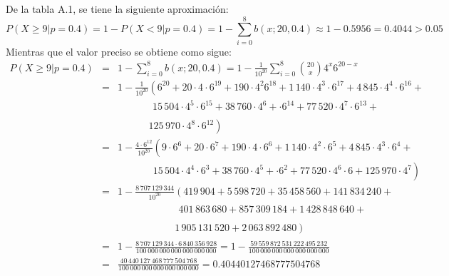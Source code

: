 \begin{solucion}
 \begin{valorp}
  De la tabla A.1, se tiene la siguiente aproximaci\'on:
  \begin{equation*}
   P\left( X \geq 9 | p = 0.4 \right) = 1 - P\left( X < 9 | p = 0.4 \right)
   = 1 - \sum_{i=0}^{8} b\left( x; 20, 0.4 \right)
   \approx 1 - 0.5956 = 0.4044 > 0.05
  \end{equation*}
  Mientras que el valor preciso se obtiene como sigue:
  \begin{eqnarray*}
   P\left( X \geq 9 | p = 0.4 \right) & = & 1 - \sum_{i=0}^{8} b\left( x; 20, 0.4 \right)
   = 1 - \frac{1}{10^{20}} \sum_{i=0}^{8} \binom{20}{x} 4^x 6^{20-x} \\
   & = & 1 - \frac{1}{10^{20}}\left( 6^{20} + 20\cdot 4\cdot 6^{19} + 
   190 \cdot 4^{2}6^{18} + 1\,140 \cdot 4^{3}\cdot 6^{17} +
   4\,845 \cdot 4^{4}\cdot 6^{16} + \right. \\
   & & \phantom{1 - \frac{1}{10^{20}} (}
   15\,504 \cdot 4^{5}\cdot 6^{15} +
   38\,760 \cdot 4^{6} + \cdot 6^{14} + 
   77\,520 \cdot 4^{7} \cdot 6^{13} + \\
   & & \phantom{1 - \frac{1}{10^{20}}}
   \left. 125\,970 \cdot 4^{8} \cdot 6^{12} \right) \\
   & = & 1 - \frac{4\cdot 6^{12}}{10^{20}} \left(9\cdot 6^6 + 
   20\cdot 6^7 + 190 \cdot 4\cdot 6^6 + 1\,140 \cdot 4^2\cdot 6^5 +
   4\,845 \cdot 4^3\cdot 6^4 + \right. \\
   & & \phantom{1 - \frac{4\cdot 6^{13}}{10^{20}}} \left.
   15\,504 \cdot 4^4\cdot 6^3 +
   38\,760 \cdot 4^5 + \cdot 6^2 + 
   77\,520 \cdot 4^6 \cdot 6 + 125\,970 \cdot 4^7 \right) \\
   & = & 1 - \frac{8\,707\,129\,344}{10^{20}} \left(
   419\,904 + 5\,598\,720 + 35\,458\,560 + 141\,834\,240 + \right. \\
   & & \phantom{1 - \frac{8\,707\,129\,344}{10^{20}} (}
   401\,863\,680 + 857\,309\,184 + 1\,428\,848\,640 + \\
   & & \phantom{1 - \frac{8\,707\,129\,344}{10^{20}}}
   \left. 1\,905\,131\,520 +  2\,063\,892\,480 \right) \\ 
   & = & 1 - 
   \frac{8\,707\,129\,344 \cdot 6\,840\,356\,928}{100\,000\,000\,000\,000\,000\,000}
   = 1-\frac{59\,559\,872\,531\,222\,495\,232}{100\,000\,000\,000\,000\,000\,000} \\
   & = & \frac{40\,440\,127\,468\,777\,504\,768}{100\,000\,000\,000\,000\,000\,000}
   = 0.40440127468777504768
  \end{eqnarray*}
 \end{valorp}


\end{solucion}
